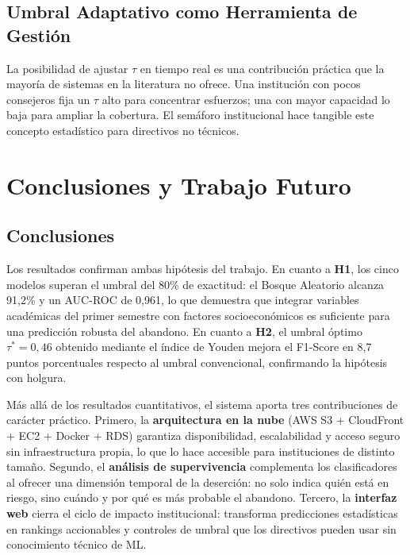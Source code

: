 \documentclass[12pt]{article}
\begin{document}
{\subsection{Umbral Adaptativo como Herramienta de Gestión}

La posibilidad de ajustar $\tau$ en tiempo real es una contribución práctica que la
mayoría de sistemas en la literatura no ofrece. Una institución con pocos consejeros
fija un $\tau$ alto para concentrar esfuerzos; una con mayor capacidad lo baja para
ampliar la cobertura. El semáforo institucional hace tangible este concepto estadístico
para directivos no técnicos.

\section{Conclusiones y Trabajo Futuro}

\subsection{Conclusiones}

Los resultados confirman ambas hipótesis del trabajo. En cuanto a \textbf{H1}, los
cinco modelos superan el umbral del 80\% de exactitud: el Bosque Aleatorio alcanza
91,2\% y un AUC-ROC de 0,961, lo que demuestra que integrar variables académicas del
primer semestre con factores socioeconómicos es suficiente para una predicción robusta
del abandono. En cuanto a \textbf{H2}, el umbral óptimo $\tau^* = 0{,}46$ obtenido
mediante el índice de Youden mejora el F1-Score en 8,7 puntos porcentuales respecto al
umbral convencional, confirmando la hipótesis con holgura.

Más allá de los resultados cuantitativos, el sistema aporta tres contribuciones de
carácter práctico. Primero, la \textbf{arquitectura en la nube} (AWS S3 + CloudFront +
EC2 + Docker + RDS) garantiza disponibilidad, escalabilidad y acceso seguro sin
infraestructura propia, lo que lo hace accesible para instituciones de distinto tamaño.
Segundo, el \textbf{análisis de supervivencia} complementa los clasificadores al ofrecer
una dimensión temporal de la deserción: no solo indica quién está en riesgo, sino cuándo
y por qué es más probable el abandono. Tercero, la \textbf{interfaz web} cierra el ciclo
de impacto institucional: transforma predicciones estadísticas en rankings accionables y
controles de umbral que los directivos pueden usar sin conocimiento técnico de ML.

}
\end{document}

